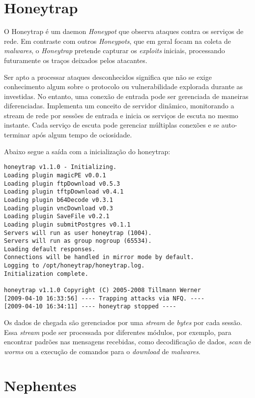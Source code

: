 \section{Honeytrap}

O Honeytrap \cite{SiteHoneytrap} é um daemon \textit{Honeypot} que observa ataques contra os serviços de rede. Em contraste com outros \textit{Honeypots}, que em geral focam na coleta de \textit{malwares}, o \textit{Honeytrap} pretende capturar os \textit{exploits} iniciais, processando futuramente os traços deixados pelos atacantes.

Ser apto a processar ataques desconhecidos significa que não se exige conhecimento algum sobre o protocolo ou vulnerabilidade explorada durante as investidas. No entanto, uma conexão de entrada pode ser gerenciada de maneiras diferenciadas. Implementa um conceito de servidor dinâmico, monitorando a stream de rede por sessões de entrada e inicia os serviços de escuta no mesmo instante. Cada serviço de escuta pode gerenciar múltiplas conexões e se auto-terminar após algum tempo de ociosidade.

Abaixo segue a saída com a inicialização do honeytrap:

\scriptsize
\begin{verbatim}
honeytrap v1.1.0 - Initializing.
Loading plugin magicPE v0.0.1
Loading plugin ftpDownload v0.5.3
Loading plugin tftpDownload v0.4.1
Loading plugin b64Decode v0.3.1
Loading plugin vncDownload v0.3
Loading plugin SaveFile v0.2.1
Loading plugin submitPostgres v0.1.1
Servers will run as user honeytrap (1004).
Servers will run as group nogroup (65534).
Loading default responses.
Connections will be handled in mirror mode by default.
Logging to /opt/honeytrap/honeytrap.log.
Initialization complete.

honeytrap v1.1.0 Copyright (C) 2005-2008 Tillmann Werner
[2009-04-10 16:33:56] ---- Trapping attacks via NFQ. ----
[2009-04-10 16:34:11] ---- honeytrap stopped ----
\end{verbatim}
\normalsize

Os dados de chegada são gerenciados por uma \textit{stream} de \textit{bytes} por cada sessão. Essa \textit{stream} pode ser processada por diferentes módulos, por exemplo, para encontrar padrões nas mensagens recebidas, como decodificação de dados, \textit{scan} de \textit{worms} ou a execução de comandos para o \textit{download} de \textit{malwares}.


\section{Nephentes}

